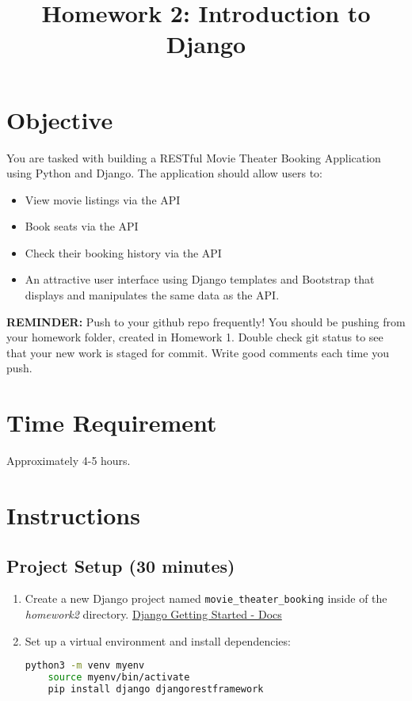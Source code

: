 \documentclass{article}
\title{Homework 2: Introduction to Django}
\author{}
\date{}
\begin{document}
\maketitle

\section{Objective}
You are tasked with building a RESTful Movie Theater Booking Application using Python and Django. The application should allow users to:

\begin{itemize}
    \item View movie listings via the API
    \item Book seats via the API
    \item Check their booking history via the API
    \item An attractive user interface using Django templates and Bootstrap that displays and manipulates the same data as the API.
\end{itemize}


\textbf{REMINDER:} Push to your github repo frequently! You should be pushing from your homework folder, created in Homework 1. Double check git status to see that your new work is staged for commit. Write good comments each time you push.

\section{Time Requirement}
Approximately 4-5 hours.

\section{Instructions}
\subsection{Project Setup (30 minutes)}
\begin{enumerate}
    \item Create a new Django project named \texttt{movie\_theater\_booking} inside of the \textit{homework2} directory. \href{https://docs.djangoproject.com/en/stable/intro/tutorial01/}{Django Getting Started - Docs}
    \item Set up a virtual environment and install dependencies:
    \begin{lstlisting}[style=customcode,language=bash]
    python3 -m venv myenv
    source myenv/bin/activate
    pip install django djangorestframework
    \end{lstlisting}
\end{enumerate}
\end{document}
